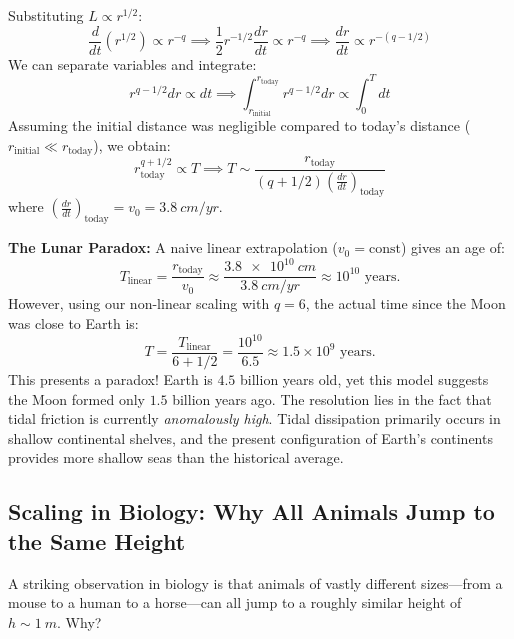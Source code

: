 Substituting $L \propto r^{1/2}$:
\[
    \frac{d}{dt} \left( r^{1/2} \right) \propto r^{-q} \implies \frac{1}{2} r^{-1/2} \frac{dr}{dt} \propto r^{-q} \implies \frac{dr}{dt} \propto r^{-(q - 1/2)}
\]
We can separate variables and integrate:
\[
    r^{q - 1/2} dr \propto dt \implies \int_{r_\text{initial}}^{r_\text{today}} r^{q - 1/2} dr \propto \int_{0}^{T} dt
\]
Assuming the initial distance was negligible compared to today's distance ($r_\text{initial} \ll r_\text{today}$), we obtain:
\[
    r_\text{today}^{q + 1/2} \propto T \implies T \sim \frac{r_\text{today}}{(q + 1/2) \left(\frac{dr}{dt}\right)_\text{today}}
\]
where $\left(\frac{dr}{dt}\right)_\text{today} = v_0 = \SI{3.8}{cm/yr}$.

\textbf{The Lunar Paradox:}
A naive linear extrapolation ($v_0 = \text{const}$) gives an age of:
\[
    T_\text{linear} = \frac{r_\text{today}}{v_0} \approx \frac{\SI{3.8e10}{cm}}{\SI{3.8}{cm/yr}} \approx 10^{10} \text{ years.}
\]
However, using our non-linear scaling with $q = 6$, the actual time since the Moon was close to Earth is:
\[
    T = \frac{T_\text{linear}}{6 + 1/2} = \frac{10^{10}}{6.5} \approx 1.5 \times 10^9 \text{ years.}
\]
This presents a paradox! Earth is $4.5$ billion years old, yet this model suggests the Moon formed only $1.5$ billion years ago. The resolution lies in the fact that tidal friction is currently \emph{anomalously high}. Tidal dissipation primarily occurs in shallow continental shelves, and the present configuration of Earth's continents provides more shallow seas than the historical average. 

\subsection{Scaling in Biology: Why All Animals Jump to the Same Height}

A striking observation in biology is that animals of vastly different sizes---from a mouse to a human to a horse---can all jump to a roughly similar height of $h \sim \SI{1}{m}$. Why?

